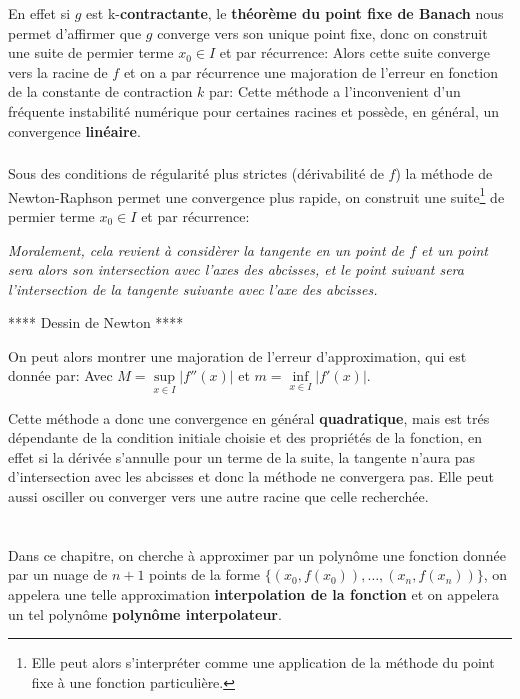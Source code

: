 En effet si \(g\) est k-\textbf{contractante}, le \textbf{théorème du point fixe de Banach} nous permet d'affirmer que \(g\) converge vers son unique point fixe, donc on construit une suite de permier terme \(x_0 \in I\) et par récurrence:
Alors cette suite converge vers la racine de \(f\) et on a par récurrence une majoration de l'erreur en fonction de la constante de contraction \(k\) par:
Cette méthode a l'inconvenient d'un fréquente instabilité numérique pour certaines racines et possède, en général, un convergence \textbf{linéaire}.

\subsection*{}
Sous des conditions de régularité plus strictes (dérivabilité de \(f\)) la méthode de Newton-Raphson permet une convergence plus rapide, on construit une suite\footnote[1]{Elle peut alors s'interpréter comme une application de la méthode du point fixe à une fonction particulière.} de permier terme \(x_0 \in I\) et par récurrence:
\begin{center}
   \textit{Moralement, cela revient à considèrer la tangente en un point de \(f\) et un point sera alors son intersection avec l'axes des abcisses, et le point suivant sera l'intersection de la tangente suivante avec l'axe des abcisses.}
\end{center}
\begin{center}
   **** Dessin de Newton ****
\end{center}
On peut alors montrer une majoration de l'erreur d'approximation, qui est donnée par:
Avec \(M = \underset{x \in I}{\sup} |f''(x)|\) et \(m = \underset{x \in I}{\inf} |f'(x)|\).\<

Cette méthode a donc une convergence en général \textbf{quadratique}, mais est trés dépendante de la condition initiale choisie et des propriétés de la fonction, en effet si la dérivée s'annulle pour un terme de la suite, la tangente n'aura pas d'intersection avec les abcisses et donc la méthode ne convergera pas. Elle peut aussi osciller ou converger vers une autre racine que celle recherchée.
\chapter*{}
Dans ce chapitre, on cherche à approximer par un polynôme une fonction donnée par un nuage de \(n + 1\) points de la forme \(\{(x_0, f(x_0)), \ldots,(x_n, f(x_n))\}\), on appelera une telle approximation \textbf{interpolation de la fonction} et on appelera un tel polynôme \textbf{polynôme interpolateur}.\<

